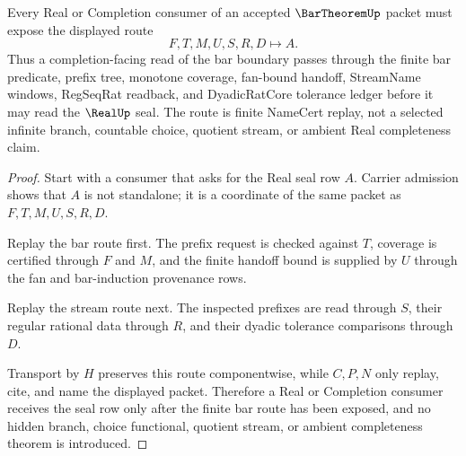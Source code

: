 \begin{theorem}
\label{thm:bar-theorem-real-completion-boundary}
Every Real or Completion consumer of an accepted $\BarTheoremUp$ packet must expose the displayed route
$$
F,T,M,U,S,R,D \longmapsto A .
$$
Thus a completion-facing read of the bar boundary passes through the finite bar predicate, prefix tree, monotone coverage, fan-bound handoff, StreamName windows, RegSeqRat readback, and DyadicRatCore tolerance ledger before it may read the $\RealUp$ seal. The route is finite NameCert replay, not a selected infinite branch, countable choice, quotient stream, or ambient Real completeness claim.
\end{theorem}
\begin{proof}
Start with a consumer that asks for the Real seal row $A$. Carrier admission shows that $A$ is not standalone; it is a coordinate of the same packet as $F,T,M,U,S,R,D$.

Replay the bar route first. The prefix request is checked against $T$, coverage is certified through $F$ and $M$, and the finite handoff bound is supplied by $U$ through the fan and bar-induction provenance rows.

Replay the stream route next. The inspected prefixes are read through $S$, their regular rational data through $R$, and their dyadic tolerance comparisons through $D$.

Transport by $H$ preserves this route componentwise, while $C,P,N$ only replay, cite, and name the displayed packet. Therefore a Real or Completion consumer receives the seal row only after the finite bar route has been exposed, and no hidden branch, choice functional, quotient stream, or ambient completeness theorem is introduced.
\end{proof}

\begin{closurestatus}{\BarTheoremUp}
  \theoryclosure{\seedClosure}
  \formalstatus{\unformalizedV}
\end{closurestatus}
